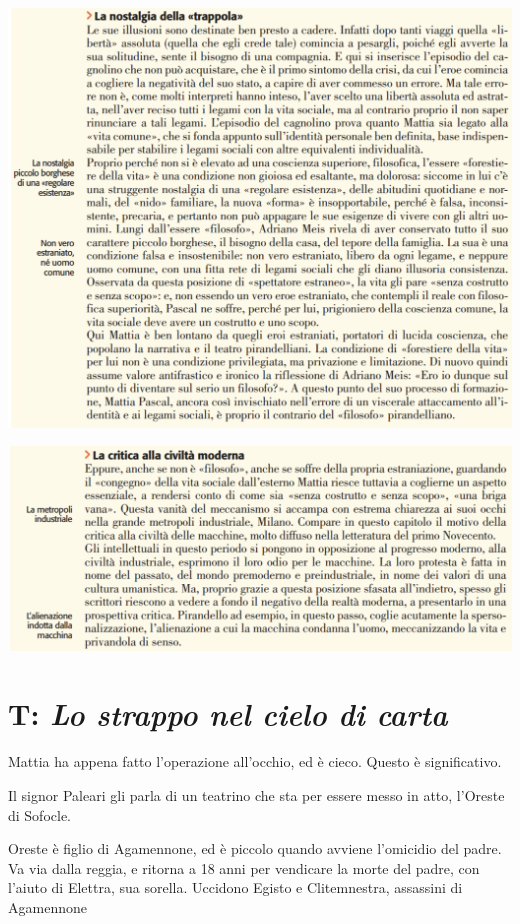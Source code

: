 \documentclass[a4paper, twoside, titlepage]{book}
\begin{document}
\begin{center}
\includegraphics[width=\textwidth]{identita3}
\end{center}

\begin{center}
\includegraphics[width=\textwidth]{identita4}
\end{center}

\section{T: \textit{Lo strappo nel cielo di carta}}

Mattia ha appena fatto l’operazione all’occhio, ed è cieco. Questo è significativo.

Il signor Paleari gli parla di un teatrino che sta per essere messo in atto, l’Oreste di Sofocle.

Oreste è figlio di Agamennone, ed è piccolo quando avviene l’omicidio del padre. Va via dalla reggia, e ritorna a 18 anni per vendicare la morte del padre, con l’aiuto di Elettra, sua sorella. Uccidono Egisto e Clitemnestra, assassini di Agamennone
\end{document}
